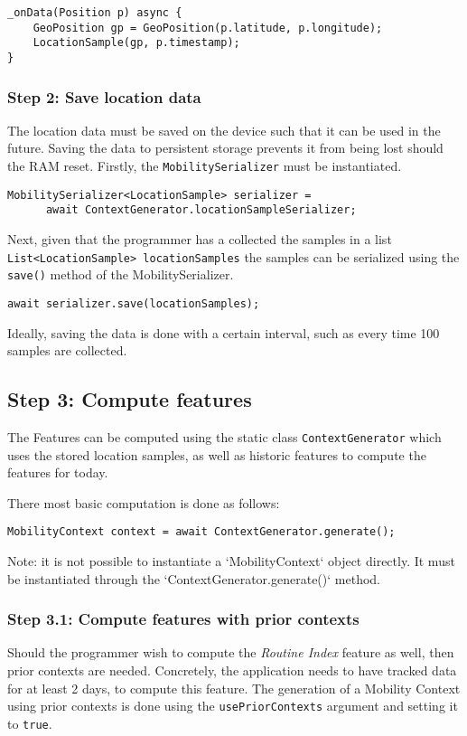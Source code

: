 \begin{verbatim}
_onData(Position p) async {
    GeoPosition gp = GeoPosition(p.latitude, p.longitude);
    LocationSample(gp, p.timestamp);
}
\end{verbatim}

\subsubsection*{Step 2: Save location data}
The location data must be saved on the device such that it can be used in the future. Saving the data to persistent storage prevents it from being lost should the RAM reset. Firstly, the \verb|MobilitySerializer| must be instantiated.

\begin{verbatim}
MobilitySerializer<LocationSample> serializer =
      await ContextGenerator.locationSampleSerializer;
\end{verbatim}

Next, given that the programmer has a collected the samples in a list \verb|List<LocationSample> locationSamples| the samples can be serialized using the \verb|save()| method of the MobilitySerializer.

\begin{verbatim}
await serializer.save(locationSamples);
\end{verbatim}

Ideally, saving the data is done with a certain interval, such as every time 100 samples are collected. 

\subsection*{Step 3: Compute features}
The Features can be computed using the static class \verb|ContextGenerator| which uses the stored location samples, as well as historic features to compute the features for today.

There most basic computation is done as follows:
\begin{verbatim}
MobilityContext context = await ContextGenerator.generate();
\end{verbatim}

Note: it is not possible to instantiate a `MobilityContext` object directly. 
It must be instantiated through the `ContextGenerator.generate()` method.

\subsubsection*{Step 3.1: Compute features with prior contexts}
Should the programmer wish to compute the \textit{Routine Index} feature as well, then prior contexts are needed. Concretely, the application needs to have tracked data for at least 2 days, to compute this feature. The generation of a Mobility Context using prior contexts is done using the \verb|usePriorContexts| argument and setting it to \verb|true|.

